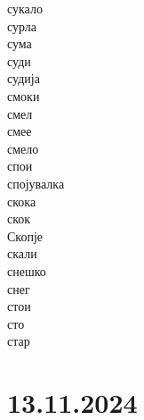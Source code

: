 \documentclass[a5paper,12pt]{article}
\newenvironment{activity}[1]{%
  \begin{tcolorbox}[colback=boxcolor,colframe=titlecolor,title={\textbf{#1}},fonttitle=\bfseries]
}{%
  \end{tcolorbox}
}
\begin{document}
\begin{activity}{Зборчиња}
\begin{multicols}{4}
сукало\\ сурла\\ сума\\ суди\\ судија\\ смоки\\ смел\\ смее\\ смело\\ спои\\ спојувалка\\ скока\\ скок\\ Скопје\\ скали\\ снешко\\ снег\\ стои\\ сто\\ стар
\end{multicols}

\end{activity}


\section{13.11.2024} 
\end{document}
